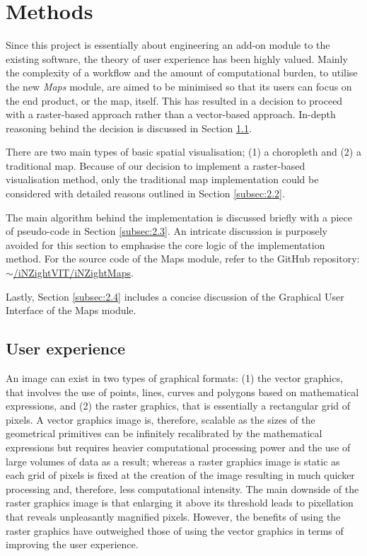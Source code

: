 \documentclass[a4paper, 12pt]{article}
\begin{document}
\section{Methods}
\label{sec:2}
Since this project is essentially about engineering an add-on module to the existing software, the theory of user experience has been highly valued. Mainly the complexity of a workflow and the amount of computational burden, to utilise the new \emph{Maps} module, are aimed to be minimised so that its users can focus on the end product, or the map, itself. This has resulted in a decision to proceed with a raster-based approach rather than a vector-based approach. In-depth reasoning behind the decision is discussed in Section \ref{subsec:2.1}.

There are two main types of basic spatial visualisation; (1) a choropleth and (2) a traditional map. Because of our decision to implement a raster-based visualisation method, only the traditional map implementation could be considered with detailed reasons outlined in Section \ref{subsec:2.2}.

The main algorithm behind the implementation is discussed briefly with a piece of pseudo-code in Section \ref{subsec:2.3}. An intricate discussion is purposely avoided for this section to emphasise the core logic of the implementation method. For the source code of the Maps module, refer to the GitHub repository: \href{https://github.com/iNZightVIT/iNZightMaps}{$\sim$/iNZightVIT/iNZightMaps}.

Lastly, Section \ref{subsec:2.4} includes a concise discussion of the Graphical User Interface of the Maps module.

\subsection{User experience}
\label{subsec:2.1}
An image can exist in two types of graphical formats: (1) the vector graphics, that involves the use of points, lines, curves and polygons based on mathematical expressions, and (2) the raster graphics, that is essentially a rectangular grid of pixels. A vector graphics image is, therefore, scalable as the sizes of the geometrical primitives can be infinitely recalibrated by the mathematical expressions but requires heavier computational processing power and the use of large volumes of data as a result; whereas a raster graphics image is static as each grid of pixels is fixed at the creation of the image resulting in much quicker processing and, therefore, less computational intensity. The main downside of the raster graphics image is that enlarging it above its threshold leads to pixellation that reveals unpleasantly magnified pixels. However, the benefits of using the raster graphics have outweighed those of using the vector graphics in terms of improving the user experience.
\end{document}

